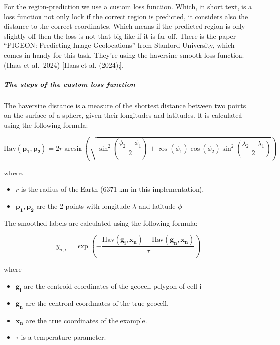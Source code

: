 For the region-prediction we use a custom loss function. Which, in short
text, is a loss function not only look if the correct region is
predicted, it considers also the distance to the correct coordinates.
Which means if the predicted region is only slightly off then the loss
is not that big like if it is far off. There is the paper ``PIGEON:
Predicting Image Geolocations'' from Stanford University, which comes in
handy for this task. They're using the haversine smooth loss function.
(Haas et al., 2024) {[}Haas et al. (2024);{]}.

\subparagraph{The steps of the custom loss
function}\label{the-steps-of-the-custom-loss-function}

The haversine distance is a measure of the shortest distance between two
points on the surface of a sphere, given their longitudes and latitudes.
It is calculated using the following formula:

\[
\text{Hav}(\mathbf{p_1}, \mathbf{p_2}) = 2r \arcsin \left( \sqrt{\sin^2 \left( \frac{\phi_2 - \phi_1}{2} \right) + \cos(\phi_1) \cos(\phi_2) \sin^2 \left( \frac{\lambda_2 - \lambda_1}{2} \right)} \right)
\]

where:

\begin{itemize}
\tightlist
\item
  \(r\) is the radius of the Earth (6371 km in this implementation),
\item
  \(\mathbf{p_1}, \mathbf{p_2}\) are the 2 points with longitude
  \(\lambda\) and latitude \(\phi\)
\end{itemize}

The smoothed labels are calculated using the following formula:

\[
y_{n,i} = \exp \left( - \frac{\text{Hav}(\mathbf{g_i}, \mathbf{x_n}) - \text{Hav}(\mathbf{g_n}, \mathbf{x_n})}{\tau} \right)
\]

where

\begin{itemize}
\tightlist
\item
  \(\mathbf{g_i}\)\hspace{0pt} are the centroid coordinates of the
  geocell polygon of cell \(\mathbf{i}\)
\item
  \(\mathbf{g_n}\)\hspace{0pt} are the centroid coordinates of the true
  geocell.
\item
  \(\mathbf{x_n}\)\hspace{0pt} are the true coordinates of the example.
\item
  \(\tau\) is a temperature parameter.
\end{itemize}

